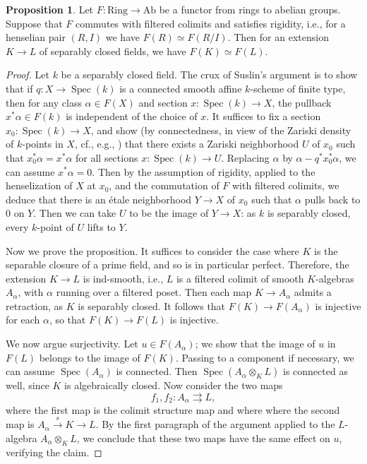 \documentclass{amsart}
\theoremstyle{definition}
\newtheorem{proposition}[definition]{Proposition}
\DeclareMathOperator{\Spec}{Spec}
\begin{document}
\begin{proposition} 
Let $F: \mathrm{Ring} \to \mathrm{Ab}$ be a functor from rings to abelian
groups. Suppose that $F$ commutes with filtered colimits and satisfies rigidity,
i.e., for a henselian pair $(R, I)$ we have $F(R) \simeq F(R/I)$. 
Then for an extension $K \to L$ of separably closed fields, we have $F(K) \simeq
F(L)$. 
\end{proposition} 
\begin{proof}
Let $k$ be a separably closed field. 
The crux of Suslin's argument is to show that if
$q:X\rightarrow\Spec(k)$ is a connected smooth affine $k$-scheme of finite type, then
  for any class $\alpha \in F(X)$ and section $x: \Spec(k) \to X$, the
 pullback $x^* \alpha \in F(k)$ is independent of the choice of $x$. 
It suffices to fix a section $x_0: \Spec(k) \to X$,  
 and show (by connectedness, in view of the Zariski density of $k$-points in
 $X$, cf., e.g.,  \cite[Tag 04QM]{stacks-project}) that there exists a Zariski neighborhood $U$ of $x_0$ such that
 $x_0^\ast\alpha = x^\ast\alpha$ for all sections $x:\Spec(k)\rightarrow U$.
 Replacing $\alpha$ by $\alpha-q^\ast x_0^\ast \alpha$, we can assume
 $x^\ast\alpha=0$.  Then by the assumption of rigidity,
 applied to the henselization of $X$ at $x_0$, and the commutation of $F$ with
 filtered colimits, we deduce that there is an \'etale neighborhood $Y\rightarrow
 X$ of $x_0$ such that $\alpha$ pulls back to $0$ on $Y$.  Then we can take $U$ to be the image of $Y\rightarrow X$: as $k$ is separably closed, every $k$-point of $U$ lifts to $Y$.

Now we prove the proposition. 
It suffices to consider the case where $K$ is the separable closure of a prime
field, and so is in particular perfect. 
Therefore, the extension $K \to L$ is ind-smooth, i.e., $L$ is a filtered colimit of smooth
$K$-algebras $A_\alpha$, with $\alpha$ running over a filtered poset.  Then each map $K \to A_\alpha$ admits
a retraction, as $K$ is separably closed. 
It follows that $F(K) \to F(A_\alpha)$ is injective for each $\alpha$, so that
$F(K) \to F(L)$ is injective. 

We now argue surjectivity. Let $u \in F(A_\alpha)$; we show that  the image of
$u$ in $F(L)$ belongs to the
image of $F(K)$.  Passing to a component if necessary, we can assume $\Spec(A_\alpha)$ is connected.  Then $\Spec(A_\alpha\otimes_K L)$ is connected as well, since $K$ is algebraically closed.  Now consider the two maps
\[ f_1, f_2:A_\alpha   \rightrightarrows L,  \]
where the first map is the colimit structure map and where
where the second map is $A_\alpha \stackrel{s}{\to} K \to L$. 
By the first paragraph of the argument applied to the $L$-algebra $A_\alpha
\otimes_K L$, we conclude that these two maps have the same effect on $u$, verifying the claim.
\end{proof} 
\end{document}
